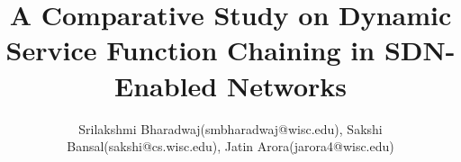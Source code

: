 \documentclass[sigplan,10pt,nonacm]{acmart}
\begin{document}


\title{\textsf{A Comparative Study on Dynamic Service Function Chaining in SDN-Enabled Networks}}


\author{ Srilakshmi Bharadwaj(smbharadwaj@wisc.edu), Sakshi Bansal(sakshi@cs.wisc.edu), Jatin Arora(jarora4@wisc.edu)}




\maketitle









{


}
\end{document}
